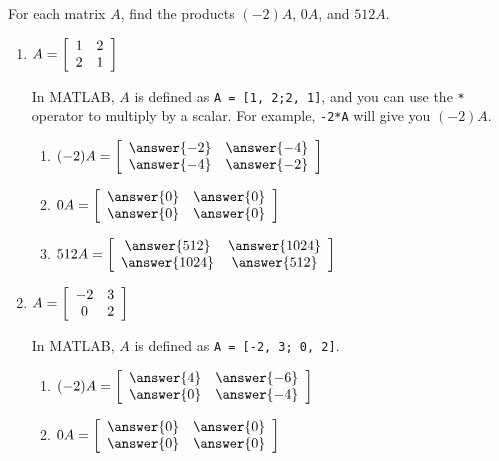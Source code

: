 \documentclass{ximera}
\author{Zack Reed}
\begin{document}
\begin{problem}
  For each matrix $A$, find the products $(-2)A$, $0A$, and $512A$.
  \begin{enumerate}
    \item
    $A = \startmat{cc}
      1 & 2 \\
      2 & 1
    \stopmat$

    \begin{hint}
    
      In MATLAB, $A$ is defined as \texttt{A = [1, 2;2, 1]}, and you can use the \texttt{*} operator to multiply by a scalar. For example, \texttt{-2*A} will give you $(-2)A$.


    \end{hint}

    \begin{enumerate}
      \item $(-2)A = 
      \startmat{cc}
      \answer{-2} & \answer{-4} \\
      \answer{-4} & \answer{-2}
      \stopmat$

      \item $0A =
      \startmat{cc}
      \answer{0} & \answer{0} \\
      \answer{0} & \answer{0}
      \stopmat$

      \item $512A =
      \startmat{cc}
      \answer{512} & \answer{1024} \\
      \answer{1024} & \answer{512}
      \stopmat$
    \end{enumerate}
  \item
    $A = \startmat{cc}
      -2 & 3 \\
      0 & 2
    \stopmat$

    \begin{hint}
      
        In MATLAB, $A$ is defined as \texttt{A = [-2, 3; 0, 2]}.

    \end{hint}

    \begin{enumerate}
      \item $(-2)A = 
      \startmat{cc}
      \answer{4} & \answer{-6} \\
      \answer{0} & \answer{-4}
      \stopmat$

      \item $0A =
      \startmat{cc}
      \answer{0} & \answer{0} \\
      \answer{0} & \answer{0}
      \stopmat$


\end{enumerate}
\end{enumerate}
\end{problem}
\end{document}
